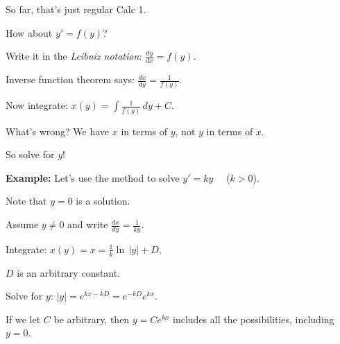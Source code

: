 \documentclass[10pt,aspectratio=169]{beamer}
\begin{document}
\begin{frame}
So far, that's just regular Calc 1.

\medskip
\pause

How about \quad
$y' = f(y)$\quad ?

\medskip
\pause

Write it in the \emph{Leibniz notation}:
\quad
$\displaystyle
\frac{dy}{dx} = f(y)$.

\medskip
\pause

Inverse function theorem says:
\quad
$\displaystyle
\frac{dx}{dy} = \frac{1}{f(y)}$.

\medskip
\pause

Now integrate:
\quad
$\displaystyle
x(y) = \int \frac{1}{f(y)} \,dy + C$.

\medskip
\pause

What's wrong?
\pause
We have $x$ in terms of $y$, not $y$ in terms of $x$.

\pause
\medskip

So solve for $y$!
\end{frame}

\begin{frame}
\textbf{Example:}
Let's use the method to solve $y'=ky$ ~~($k > 0$).

\medskip
\pause

Note that $y=0$ is a solution.

\medskip
\pause

Assume $y \neq 0$ and write
\quad$\displaystyle
\frac{dx}{dy} = \frac{1}{ky}$.

\medskip
\pause

Integrate:
\quad
\quad$\displaystyle
x(y) = x = \frac{1}{k} \ln \, \lvert y \rvert + D$,

\medskip

$D$ is an arbitrary constant.

\medskip
\pause

Solve for $y$:
\quad
\quad$\displaystyle
\lvert y \rvert =
e^{kx-kD} = 
e^{-kD} e^{k x}$.

\medskip
\pause

If we let $C$ be arbitrary, then $y=Ce^{kx}$ includes all
the possibilities, including $y=0$.
\end{frame}
\end{document}

